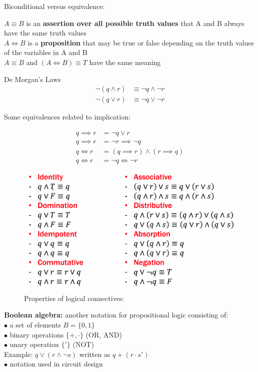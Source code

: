 \documentclass{article}
\begin{document}
    Biconditional versus equivalence:

    $A \equiv B$ is an \textbf{assertion over all possible truth values} that A and B always have the same truth values \\
    $A \iff B$ is a \textbf{proposition} that may be true or false depending on the truth values of the variables in A and B \\
    $A\equiv B$ and $(A\iff B) \equiv T$ have the same meaning

    \begin{axiom}{De Morgan's Laws}
        \begin{align*}
            \neg (q\land r) &\equiv \neg q \land \neg r \\
            \neg(q\lor r)   &\equiv \neg q \lor \neg r
        \end{align*}
    \end{axiom}

    Some equivalences related to implication:

    \begin{align*}
        q \implies r    &= \neg q \lor r \\
        q \implies r    &= \neg r \implies \neg q \\
        q \iff r        &= (q\implies r) \land (r\implies q) \\
        q \iff r        &= \neg q \iff \neg r
    \end{align*}

    \begin{figure}[hbt!]
        \centering
        \caption*{Properties of logical connectives:}
        \includegraphics[scale = 0.75]{Assets/Connectives}
    \end{figure}

    \textbf{Boolean algebra:} another notation for propositional logic consisting of: \\
    $\bullet$ a set of elements $B = \{0,1\}$ \\
    $\bullet$ binary operations $\{+,\cdot\}$ (OR, AND) \\
    $\bullet$ unary operation $\{'\}$ (NOT) \\

    Example: $q\lor (r\land \neg s)$ written as $q+(r\cdot s')$ \\
    $\bullet$ notation used in circuit design \\
\end{document}
